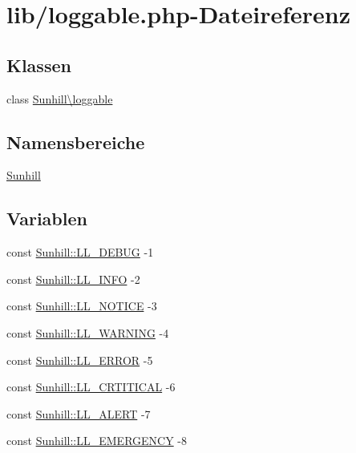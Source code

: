 \hypertarget{loggable_8php}{}\section{lib/loggable.php-\/\+Dateireferenz}
\label{loggable_8php}
\subsection*{Klassen}
\begin{DoxyCompactItemize}
\item 
class \hyperlink{classSunhill_1_1loggable}{Sunhill\textbackslash{}loggable}
\end{DoxyCompactItemize}
\subsection*{Namensbereiche}
\begin{DoxyCompactItemize}
\item 
 \hyperlink{namespaceSunhill}{Sunhill}
\end{DoxyCompactItemize}
\subsection*{Variablen}
\begin{DoxyCompactItemize}
\item 
const \hyperlink{namespaceSunhill_aa81a8ba0a946e1ae6e8052ed3fb287b9}{Sunhill\+::\+L\+L\+\_\+\+D\+E\+B\+UG} -\/1
\item 
const \hyperlink{namespaceSunhill_a20ab942ef407f9ee67ecdffea22342ea}{Sunhill\+::\+L\+L\+\_\+\+I\+N\+FO} -\/2
\item 
const \hyperlink{namespaceSunhill_a00054d338cccda7e89a39f3dd399cbe2}{Sunhill\+::\+L\+L\+\_\+\+N\+O\+T\+I\+CE} -\/3
\item 
const \hyperlink{namespaceSunhill_a931aba40f1eb07e632a24d26129b1c89}{Sunhill\+::\+L\+L\+\_\+\+W\+A\+R\+N\+I\+NG} -\/4
\item 
const \hyperlink{namespaceSunhill_a18824a9b58f9659012bf40e63af95a29}{Sunhill\+::\+L\+L\+\_\+\+E\+R\+R\+OR} -\/5
\item 
const \hyperlink{namespaceSunhill_ae795331bde625992598959c1f2e70caa}{Sunhill\+::\+L\+L\+\_\+\+C\+R\+T\+I\+T\+I\+C\+AL} -\/6
\item 
const \hyperlink{namespaceSunhill_a99e0b75bfa2ba003918968ad49b440b8}{Sunhill\+::\+L\+L\+\_\+\+A\+L\+E\+RT} -\/7
\item 
const \hyperlink{namespaceSunhill_ac2b5d8b023dc1b808d7e16273bb3a3ab}{Sunhill\+::\+L\+L\+\_\+\+E\+M\+E\+R\+G\+E\+N\+CY} -\/8
\end{DoxyCompactItemize}
